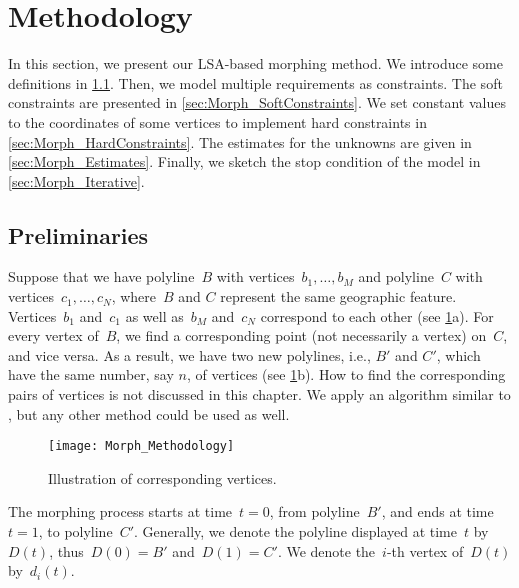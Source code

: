 \section{Methodology}
\label{sec:Morph_Methodology}
In this section, we present our LSA-based morphing method. 
We introduce some 
definitions in \sect\ref{sec:Morph_Preliminaries}. 
Then, we model multiple requirements as constraints. 
The soft constraints are presented in 
\sect\ref{sec:Morph_SoftConstraints}. 
We set constant values to the coordinates of some 
vertices to implement hard constraints in 
\sect\ref{sec:Morph_HardConstraints}. 
The estimates for the unknowns are given in 
\sect\ref{sec:Morph_Estimates}. 
Finally, we sketch the stop condition of the model in 
\sect\ref{sec:Morph_Iterative}.

\subsection{Preliminaries}
\label{sec:Morph_Preliminaries}
Suppose that we have
polyline~$B$ with vertices~$b_1, \dots,b_M$ and 
polyline~$C$ with vertices~$c_1,\dots,c_N$, 
where~$B$ and $C$ represent the same geographic feature. 
Vertices~$b_1$ and~$c_1$ as well as~$b_M$ and~$c_N$ correspond 
to each other (see \fig\ref{fig:Morph_Injection}a). 
For every vertex of~$B$, we find a corresponding point (not 
necessarily a vertex) on~$C$, and vice versa. 
As a result, we have two new polylines, i.e., $B'$ and $C'$,
which have the same number, say $n$, of vertices
(see \fig\ref{fig:Morph_Injection}b).
How to find the corresponding pairs of vertices 
is not discussed in this chapter. 
We apply an algorithm similar to
\textcite{Noellenburg2008}, 
but any other method could be used as well.
\begin{figure}[tb]
	\centering	
	\texttt{[image: Morph\_Methodology]}
	\caption{Illustration of corresponding vertices.}
	\label{fig:Morph_Injection}
\end{figure}



The morphing process starts at time~$t=0$, from polyline~$B'$, 
and ends at time~$t=1$, to polyline~$C'$. 
Generally, we denote the polyline 
displayed at time~$t$ by~$D(t)$, 
thus~$D(0)=B'$ and~$D(1)=C'$. 
We denote the~$i$-th vertex of~$D(t)$ by~$d_i (t)$.


